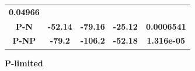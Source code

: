 \documentclass[]{article}
\begin{document}
\begin{longtable}[]{@{}ccccc@{}}
\begin{minipage}[t]{0.16\columnwidth}
\textbf{0.04966}
\strut\end{minipage}\tabularnewline
\begin{minipage}[t]{0.13\columnwidth}\centering\strut
\textbf{P-N}
\strut\end{minipage} &
\begin{minipage}[t]{0.13\columnwidth}\centering\strut
\textbf{-52.14}
\strut\end{minipage} &
\begin{minipage}[t]{0.14\columnwidth}\centering\strut
\textbf{-79.16}
\strut\end{minipage} &
\begin{minipage}[t]{0.13\columnwidth}\centering\strut
\textbf{-25.12}
\strut\end{minipage} &
\begin{minipage}[t]{0.16\columnwidth}\centering\strut
\textbf{0.0006541}
\strut\end{minipage}\tabularnewline
\begin{minipage}[t]{0.13\columnwidth}\centering\strut
\textbf{P-NP}
\strut\end{minipage} &
\begin{minipage}[t]{0.13\columnwidth}\centering\strut
\textbf{-79.2}
\strut\end{minipage} &
\begin{minipage}[t]{0.14\columnwidth}\centering\strut
\textbf{-106.2}
\strut\end{minipage} &
\begin{minipage}[t]{0.13\columnwidth}\centering\strut
\textbf{-52.18}
\strut\end{minipage} &
\begin{minipage}[t]{0.16\columnwidth}\centering\strut
\textbf{1.316e-05}
\strut\end{minipage}\tabularnewline
\bottomrule
\end{longtable}

\textbf{P-limited}
\end{document}
